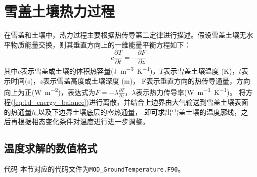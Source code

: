 \chapter{雪盖土壤热力过程}


在雪盖和土壤中，热力过程主要根据热传导第二定律进行描述。假设雪盖土壤无水平物质能量交换，则其垂直方向上的一维能量平衡方程如下：
\begin{equation}\label{eq:1d_energy_balance}
  c \frac{\partial T}{\partial t}=-\frac{\partial F}{\partial z}
\end{equation}
其中$c$表示雪盖或土壤的体积热容量(\unit{J.m^{-3}.K^{-1}})，$T$表示雪盖土壤温度 (K)，$t$表示时间(s)，$z$表示雪盖高度或土壤深度 (m)，
F表示垂直方向的热传导通量，方向向上为正(\unit{W.m^{-2}})，表达式为$F=-\lambda\frac{\partial T}{\partial z}$，$\lambda$表示热力传导率(\unit{W.m^{-1}.K^{-1}})。
将方程(\ref{eq:1d_energy_balance})进行离散，并结合上边界由大气输送到雪盖土壤表面的热通量$h_{\mathrm {s}} $以及下边界土壤底层的零热通量，
即可求出雪盖土壤的温度廓线，之后再根据相态变化条件对温度进行进一步调整。


\section{温度求解的数值格式}\label{温度求解的数值格式}

\begin{mymdframed}{代码}
  本节对应的代码文件为\texttt{MOD\_GroundTemperature.F90}。
\end{mymdframed}


